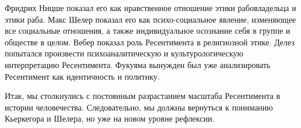 Фридрих Ницше показал его как нравственное отношение этики рабовладельца и
этики раба. Макс Шелер показал его как психо-социальное явление, изменяющее все
социальные отношения, а также индивидуальное осознание себя в группе и обществе
в целом. Вебер показал роль Ресентимента в религиозной этике. Делез попытался
произвести психоаналитическую и культурологическую интерпретацию Ресентимента.
Фукуяма вынужден был уже анализировать Ресентимент как идентичность и политику.

Итак, мы столкнулись с постоянным разрастанием масштаба Ресентимента в истории
человечества. Следовательно, мы должны вернуться к пониманию Кьеркегора и
Шелера, но уже на новом уровне рефлексии.
